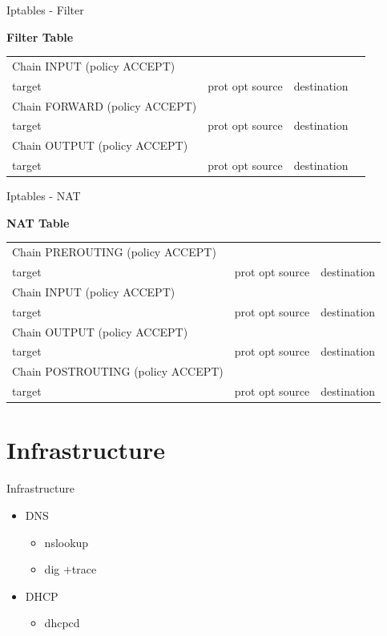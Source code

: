 \documentclass[aspectratio=169,10pt,t]{beamer}
\begin{document}
\begin{frame}[t]{Iptables - Filter}{\phantom{(y)}}

	\textbf{Filter Table}
	\begin{tabular}{*{4}{l}}
		Chain INPUT (policy ACCEPT)&&&\\
		target&prot opt source&destination&\\

		Chain FORWARD (policy ACCEPT)\\
		target&prot opt source&destination&\\

		Chain OUTPUT (policy ACCEPT)\\
		target&prot opt source&destination&\\
	\end{tabular}

	
\end{frame}
\begin{frame}[t]{Iptables - NAT}{\phantom{(y)}}

	\textbf{NAT Table}
	\begin{tabular}{*{3}{l}}
		Chain PREROUTING (policy ACCEPT)\\
		target&prot opt source&destination\\

		Chain INPUT (policy ACCEPT)\\
		target&prot opt source&destination\\

		Chain OUTPUT (policy ACCEPT)\\
		target&prot opt source&destination\\

		Chain POSTROUTING (policy ACCEPT)\\
		target&prot opt source&destination
	\end{tabular}
	
\end{frame}

\section{Infrastructure}%
\label{sec:routing}


\begin{frame}[t]{Infrastructure}{\phantom{(y)}}
	\begin{itemize}
		\item DNS
			\begin{itemize}
				\item nslookup
				\item dig +trace
			\end{itemize}
		\item DHCP
			\begin{itemize}
				\item dhcpcd
			\end{itemize}
	\end{itemize}
\end{frame}
\end{document}
